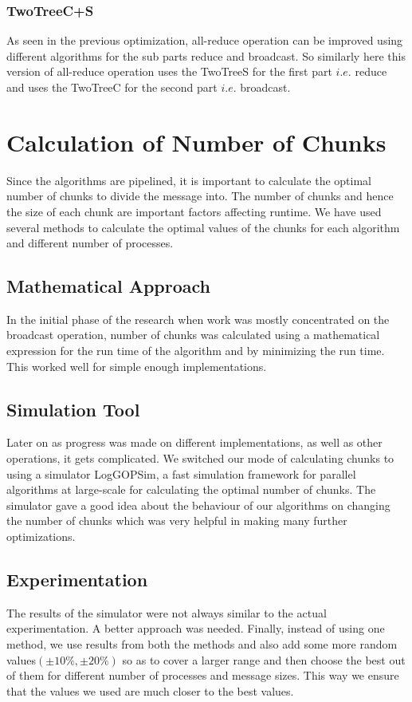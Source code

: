 \documentclass[sigplan,review,anonymous]{acmart}\settopmatter{printfolios=true,printccs=false,printacmref=false}
\begin{document}
\subsubsection{TwoTreeC+S}
As seen in the previous optimization, all-reduce operation can be improved using different algorithms for the sub parts reduce and broadcast. So similarly here this version of all-reduce operation uses the TwoTreeS for the first part $i.e.$ reduce and uses the TwoTreeC for the second part $i.e.$ broadcast.

\section{Calculation of Number of Chunks} \label{sec:Chunks}
Since the algorithms are pipelined, it is important to calculate the optimal number of chunks to divide the message into. The number of chunks and hence the size of each chunk are important factors affecting runtime. %
We have used several methods to calculate the optimal values of the chunks for each algorithm and different number of processes.
\subsection{Mathematical Approach}
In the initial phase of the research when work was mostly concentrated on the broadcast operation, number of chunks was calculated using a mathematical expression for the run time of the algorithm and by minimizing the run time. This worked well for simple enough implementations.
\subsection{Simulation Tool}
Later on as progress was made on different implementations, as well as other operations, it gets complicated. We switched our mode of calculating chunks to using a simulator LogGOPSim, a fast simulation framework for parallel algorithms at large-scale for calculating the optimal number of chunks. The simulator gave a good idea about the behaviour of our algorithms on changing the number of chunks which was very helpful in making many further optimizations.
\subsection{Experimentation}
The results of the simulator were not always similar to the actual experimentation. A better approach was needed. Finally, instead of using one method, we use results from both the methods and also add some more random values\((\pm10\%, \pm20\%)\) so as to cover a larger range and then choose the best out of them for different number of processes and message sizes. This way we ensure that the values we used are much closer to the best values.
\end{document}
